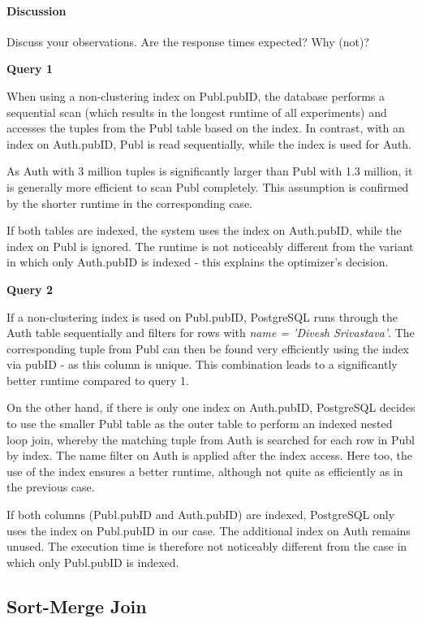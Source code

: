 \documentclass[11pt]{scrartcl}
\begin{document}
\paragraph{Discussion}

Discuss your observations. Are the response times expected? Why (not)?

\textbf{Query 1}

When using a non-clustering index on Publ.pubID, the database performs a
sequential scan (which results in the longest runtime of all
experiments) and accesses the tuples from the Publ table based on the
index.  In contrast, with an index on Auth.pubID, Publ is read
sequentially, while the index is used for Auth.

As Auth with 3 million tuples is significantly larger than Publ with 1.3
million, it is generally more efficient to scan Publ completely.  This
assumption is confirmed by the shorter runtime in the corresponding
case.

If both tables are indexed, the system uses the index on Auth.pubID,
while the index on Publ is ignored.  The runtime is not noticeably
different from the variant in which only Auth.pubID is indexed - this
explains the optimizer's decision.

\textbf{Query 2}

If a non-clustering index is used on Publ.pubID, PostgreSQL runs through
the Auth table sequentially and filters for rows with \textit{name =
'Divesh Srivastava'}.  The corresponding tuple from Publ can then be
found very efficiently using the index via pubID - as this column is
unique.  This combination leads to a significantly better runtime
compared to query 1.

On the other hand, if there is only one index on Auth.pubID, PostgreSQL
decides to use the smaller Publ table as the outer table to perform an
indexed nested loop join, whereby the matching tuple from Auth is
searched for each row in Publ by index.  The name filter on Auth is
applied after the index access. Here too, the use of the index ensures a
better runtime, although not quite as efficiently as in the previous
case.

If both columns (Publ.pubID and Auth.pubID) are indexed, PostgreSQL only
uses the index on Publ.pubID in our case.  The additional index on Auth
remains unused.  The execution time is therefore not noticeably
different from the case in which only Publ.pubID is indexed.

\subsection*{Sort-Merge Join}
\end{document}
